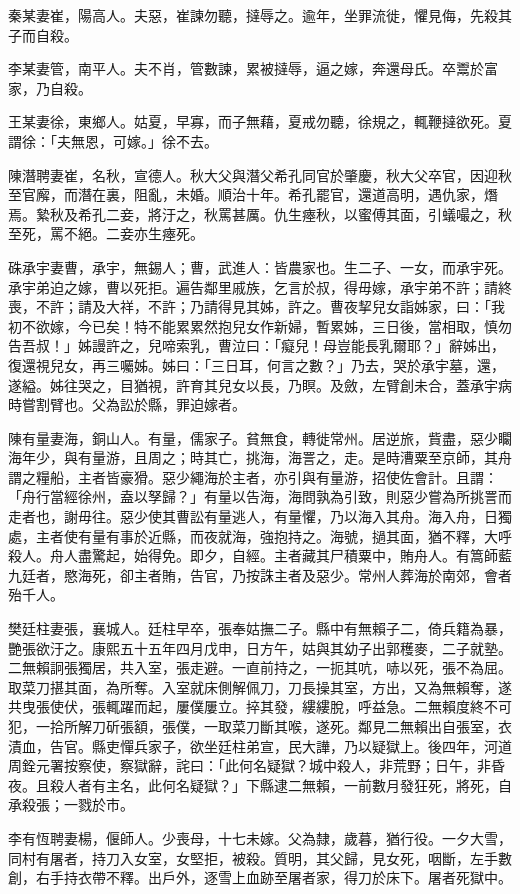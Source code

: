 \begin{pinyinscope}
秦某妻崔，陽高人。夫惡，崔諫勿聽，撻辱之。逾年，坐罪流徙，懼見侮，先殺其子而自殺。

李某妻管，南平人。夫不肖，管數諫，累被撻辱，逼之嫁，奔還母氏。卒鬻於富家，乃自殺。

王某妻徐，東鄉人。姑夏，早寡，而子無藉，夏戒勿聽，徐規之，輒鞭撻欲死。夏謂徐：「夫無恩，可嫁。」徐不去。

陳潛聘妻崔，名秋，宣德人。秋大父與潛父希孔同官於肇慶，秋大父卒官，因迎秋至官廨，而潛在裏，阻亂，未婚。順治十年。希孔罷官，還道高明，遇仇家，熸焉。縶秋及希孔二妾，將汙之，秋罵甚厲。仇生瘞秋，以蜜傅其面，引蟻嘬之，秋至死，罵不絕。二妾亦生瘞死。

硃承宇妻曹，承宇，無錫人；曹，武進人：皆農家也。生二子、一女，而承宇死。承宇弟迫之嫁，曹以死拒。遍告鄰里戚族，乞言於叔，得毋嫁，承宇弟不許；請終喪，不許；請及大祥，不許；乃請得見其姊，許之。曹夜挈兒女詣姊家，曰：「我初不欲嫁，今已矣！特不能累累然抱兒女作新婦，暫累姊，三日後，當相取，慎勿告吾叔！」姊謾許之，兒啼索乳，曹泣曰：「癡兒！母豈能長乳爾耶？」辭姊出，復還視兒女，再三囑姊。姊曰：「三日耳，何言之數？」乃去，哭於承宇墓，還，遂縊。姊往哭之，目猶視，許育其兒女以長，乃瞑。及斂，左臂創未合，蓋承宇病時嘗割臂也。父為訟於縣，罪迫嫁者。

陳有量妻海，銅山人。有量，儒家子。貧無食，轉徙常州。居逆旅，貲盡，惡少矙海年少，與有量游，且周之；時其亡，挑海，海詈之，走。是時漕粟至京師，其舟謂之糧船，主者皆豪猾。惡少繩海於主者，亦引與有量游，招使佐會計。且謂：「舟行當經徐州，盍以孥歸？」有量以告海，海問孰為引致，則惡少嘗為所挑詈而走者也，謝毋往。惡少使其曹訟有量逃人，有量懼，乃以海入其舟。海入舟，日獨處，主者使有量有事於近縣，而夜就海，強抱持之。海號，撾其面，猶不釋，大呼殺人。舟人盡驚起，始得免。即夕，自經。主者藏其尸積粟中，賄舟人。有篙師藍九廷者，愍海死，卻主者賄，告官，乃按誅主者及惡少。常州人葬海於南郊，會者殆千人。

樊廷柱妻張，襄城人。廷柱早卒，張奉姑撫二子。縣中有無賴子二，倚兵籍為暴，艷張欲汙之。康熙五十五年四月戊申，日方午，姑與其幼子出郭穫麥，二子就塾。二無賴詗張獨居，共入室，張走避。一直前持之，一扼其吭，哧以死，張不為屈。取菜刀揕其面，為所奪。入室就床側解佩刀，刀長操其室，方出，又為無賴奪，遂共曳張使伏，張輒躍而起，屢僕屢立。捽其發，縷縷脫，呼益急。二無賴度終不可犯，一拾所解刀斫張額，張僕，一取菜刀斷其喉，遂死。鄰見二無賴出自張室，衣漬血，告官。縣吏憚兵家子，欲坐廷柱弟宣，民大譁，乃以疑獄上。後四年，河道周銓元署按察使，察獄辭，詫曰：「此何名疑獄？城中殺人，非荒野；日午，非昏夜。且殺人者有主名，此何名疑獄？」下縣逮二無賴，一前數月發狂死，將死，自承殺張；一戮於市。

李有恆聘妻楊，偃師人。少喪母，十七未嫁。父為隸，歲暮，猶行役。一夕大雪，同村有屠者，持刀入女室，女堅拒，被殺。質明，其父歸，見女死，咽斷，左手數創，右手持衣帶不釋。出戶外，逐雪上血跡至屠者家，得刀於床下。屠者死獄中。


\end{pinyinscope}
